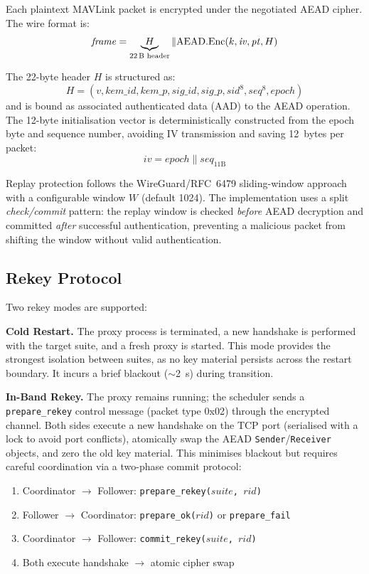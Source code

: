 \documentclass[conference]{IEEEtran}
\begin{document}
Each plaintext MAVLink packet is encrypted under the negotiated AEAD cipher.
The wire format is:
\begin{equation}
    \mathit{frame} = \underbrace{H}_{\text{22\,B header}} \mathbin\| \mathrm{AEAD.Enc}(k, \mathit{iv}, \mathit{pt}, H)
\end{equation}

The 22-byte header $H$ is structured as:
\[
H = (v, \mathit{kem\_id}, \mathit{kem\_p}, \mathit{sig\_id}, \mathit{sig\_p}, \mathit{sid}^{8}, \mathit{seq}^{8}, \mathit{epoch})
\]
and is bound as associated authenticated data (AAD) to the AEAD operation.
The 12-byte initialisation vector is deterministically constructed from the epoch byte and sequence number, avoiding IV transmission and saving 12~bytes per packet:
\begin{equation}
    \mathit{iv} = \mathit{epoch} \mathbin\| \mathit{seq}_{11\text{B}}
\end{equation}

Replay protection follows the WireGuard/RFC~6479 sliding-window approach with a configurable window $W$ (default 1024).
The implementation uses a split \emph{check/commit} pattern: the replay window is checked \emph{before} AEAD decryption and committed \emph{after} successful authentication, preventing a malicious packet from shifting the window without valid authentication.

\subsection{Rekey Protocol}

Two rekey modes are supported:

\textbf{Cold Restart.}
The proxy process is terminated, a new handshake is performed with the target suite, and a fresh proxy is started.
This mode provides the strongest isolation between suites, as no key material persists across the restart boundary.
It incurs a brief blackout ($\sim$\SI{2}{\second}) during transition.

\textbf{In-Band Rekey.}
The proxy remains running; the scheduler sends a \texttt{prepare\_rekey} control message (packet type 0x02) through the encrypted channel.
Both sides execute a new handshake on the TCP port (serialised with a lock to avoid port conflicts), atomically swap the AEAD \texttt{Sender}/\texttt{Receiver} objects, and zero the old key material.
This minimises blackout but requires careful coordination via a two-phase commit protocol:

\begin{enumerate}[noitemsep]
    \item Coordinator $\to$ Follower: \texttt{prepare\_rekey($\mathit{suite}$, $\mathit{rid}$)}
    \item Follower $\to$ Coordinator: \texttt{prepare\_ok($\mathit{rid}$)} or \texttt{prepare\_fail}
    \item Coordinator $\to$ Follower: \texttt{commit\_rekey($\mathit{suite}$, $\mathit{rid}$)}
    \item Both execute handshake $\to$ atomic cipher swap
\end{enumerate}
\end{document}
